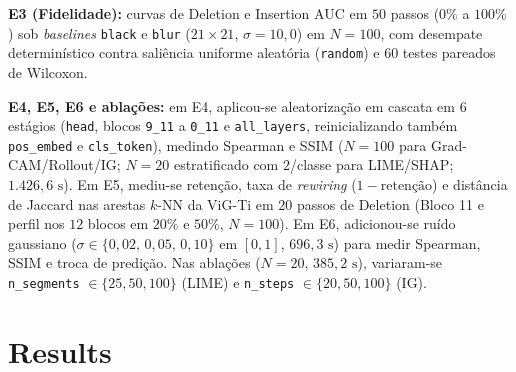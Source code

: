 \documentclass{article}
\begin{document}
\textbf{E3 (Fidelidade):} curvas de Deletion e Insertion AUC em $50$ passos ($0\%$ a $100\%$) sob \textit{baselines} \texttt{black} e \texttt{blur} ($21 \times 21$, $\sigma = 10{,}0$) em $N = 100$, com desempate determinístico contra saliência uniforme aleatória (\texttt{random}) e $60$ testes pareados de Wilcoxon.

\textbf{E4, E5, E6 e ablações:} em E4, aplicou-se aleatorização em cascata em $6$ estágios (\texttt{head}, blocos \texttt{9\_11} a \texttt{0\_11} e \texttt{all\_layers}, reinicializando também \texttt{pos\_embed} e \texttt{cls\_token}), medindo Spearman e SSIM ($N = 100$ para Grad-CAM/Rollout/IG; $N = 20$ estratificado com $2$/classe para LIME/SHAP; $1.426{,}6\text{ s}$). Em E5, mediu-se retenção, taxa de \textit{rewiring} ($1 - \text{retenção}$) e distância de Jaccard nas arestas $k$-NN da ViG-Ti em $20$ passos de Deletion (Bloco 11 e perfil nos $12$ blocos em $20\%$ e $50\%$, $N = 100$). Em E6, adicionou-se ruído gaussiano ($\sigma \in \{0{,}02,\,0{,}05,\,0{,}10\}$ em $[0, 1]$, $696{,}3\text{ s}$) para medir Spearman, SSIM e troca de predição. Nas ablações ($N = 20$, $385{,}2\text{ s}$), variaram-se \texttt{n\_segments} $\in \{25, 50, 100\}$ (LIME) e \texttt{n\_steps} $\in \{20, 50, 100\}$ (IG).

\section{Results}
\label{sec:results}


\end{document}
